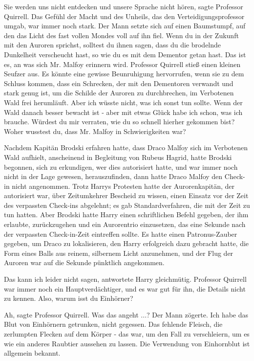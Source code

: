 \glqq Sie werden uns nicht entdecken und unsere Sprache nicht hören\grqq{},
sagte Professor Quirrell. Das Gefühl der Macht und des Unheils, das den
Verteidigungsprofessor umgab, war immer noch stark. Der Mann setzte sich
auf einen Baumstumpf, auf den das Licht des fast vollen Mondes voll auf
ihn fiel. \glqq Wenn du in der Zukunft mit den Auroren sprichst, solltest
du ihnen sagen, dass du die brodelnde Dunkelheit verscheucht hast, so wie
du es mit dem Dementor getan hast. Das ist es, an was sich Mr. Malfoy
erinnern wird.\grqq{} Professor Quirrell stieß einen kleinen Seufzer aus.
\glqq Es könnte eine gewisse Beunruhigung hervorrufen, wenn sie zu dem
Schluss kommen, dass ein Schrecken, der mit den Dementoren verwandt und
stark genug ist, um die Schilde der Auroren zu durchbrechen, im
Verbotenen Wald frei herumläuft. Aber ich wüsste nicht, was ich sonst tun
sollte. Wenn der Wald danach besser bewacht ist - aber mit etwas Glück
habe ich schon, was ich brauche. Würdest du mir verraten, wie du so
schnell hierher gekommen bist? Woher wusstest du, dass Mr. Malfoy in
Schwierigkeiten war?\grqq{}

Nachdem Kapitän Brodski erfahren hatte, dass Draco Malfoy sich im Verbotenen
Wald aufhielt, anscheinend in Begleitung von Rubeus Hagrid, hatte Brodski
begonnen, sich zu erkundigen, wer dies autorisiert hatte, und war immer
noch nicht in der Lage gewesen, herauszufinden, dann hatte Draco Malfoy
den Check-in nicht angenommen. Trotz Harrys Protesten hatte der
Aurorenkapitän, der autorisiert war, über Zeitumkehrer Bescheid zu
wissen, einen Einsatz vor der Zeit des verpassten Check-ins abgelehnt; es
gab Standardverfahren, die mit der Zeit zu tun hatten. Aber Brodski hatte
Harry einen schriftlichen Befehl gegeben, der ihm erlaubte, zurückzugehen
und ein Aurorentrio einzusetzen, das eine Sekunde nach der verpassten
Check-in-Zeit eintreffen sollte. Es hatte einen Patronus-Zauber gegeben,
um Draco zu lokalisieren, den Harry erfolgreich dazu gebracht hatte, die
Form eines Balls aus reinem, silbernem Licht anzunehmen, und der Flug der
Auroren war auf die Sekunde pünktlich angekommen.

\glqq Das kann ich leider nicht sagen\grqq{}, antwortete Harry gleichmütig.
Professor Quirrell war immer noch ein Hauptverdächtiger, und es war gut
für ihn, die Details nicht zu kennen. \glqq Also, warum isst du
Einhörner?\grqq{}

\glqq Ah\grqq{}, sagte Professor Quirrell. \glqq Was das angeht ...?\grqq{} Der
Mann zögerte. \glqq Ich habe das Blut von Einhörnern getrunken, nicht
gegessen. Das fehlende Fleisch, die zerlumpten Flecken auf dem Körper -
das war, um den Fall zu verschleiern, um es wie ein anderes Raubtier
aussehen zu lassen. Die Verwendung von Einhornblut ist allgemein
bekannt.\grqq{}

